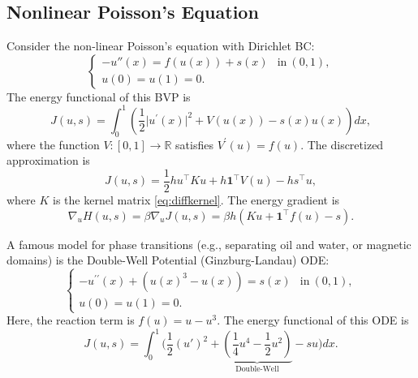 \documentclass[11pt]{article}
\newcommand{\bbR}{\mathbb{R}}
\begin{document}
\subsection{Nonlinear Poisson's Equation}
Consider the non-linear Poisson's equation with Dirichlet BC:
\begin{equation*}
\begin{cases}
-u''(x) = f(u(x))+ s(x) &\text{in}\ (0,1),\\
u(0)=u(1)=0.
\end{cases}
\end{equation*}
The energy functional of this BVP is
\begin{equation*}
    J(u,s)=\int_0^1\left(\frac{1}{2}\vert u^\prime(x)\vert^2+V(u(x))-s(x)u(x)\right) dx,
\end{equation*}
where the function $V:[0,1]\to\bbR$ satisfies $V^\prime(u)=f(u)$. The discretized approximation is
\begin{equation*}
    J(u,s)=\frac{1}{2}hu^\top Ku+h\mathbf{1}^\top V(u)-hs^\top u,
\end{equation*}
where $K$ is the kernel matrix \eqref{eq:diffkernel}. The energy gradient is
\begin{equation*}
    \nabla_u H(u,s)=\beta\nabla_u J(u,s)=\beta h\left(Ku+\mathbf{1}^\top f(u)-s\right).
\end{equation*}

A famous model for phase transitions (e.g., separating oil and water, or magnetic domains) is the Double-Well Potential (Ginzburg-Landau) ODE:
\begin{equation*}
\begin{cases}
-u^{\prime\prime}(x) + (u(x)^3 - u(x)) = s(x) &\text{in}\ (0,1),\\
u(0)=u(1)=0.
\end{cases}
\end{equation*}
Here, the reaction term is $f(u) = u-u^3$. The energy functional of this ODE is
$$J(u,s) = \int_0^1 \biggl( \frac{1}{2} (u')^2 + \underbrace{\left(\frac{1}{4}u^4 - \frac{1}{2}u^2\right)}_{\text{Double-Well}} - su \biggr) dx.$$
\end{document}
